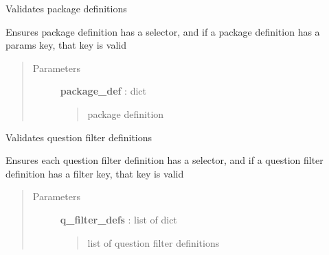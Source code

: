 \documentclass[letterpaper,10pt,english]{sphinxmanual}
\begin{document}
\begin{fulllineitems}
\label{pytan.utils:pytan.utils.val_package_def}
Validates package definitions

Ensures package definition has a selector, and if a package definition has a params key, that key is valid
\begin{quote}\begin{description}
\item[{Parameters}] \leavevmode
\textbf{package\_def} : dict
\begin{quote}

package definition
\end{quote}

\end{description}\end{quote}

\end{fulllineitems}


\begin{fulllineitems}
\label{pytan.utils:pytan.utils.val_q_filter_defs}
Validates question filter definitions

Ensures each question filter definition has a selector, and if a question filter definition has a filter key, that key is valid
\begin{quote}\begin{description}
\item[{Parameters}] \leavevmode
\textbf{q\_filter\_defs} : list of dict
\begin{quote}

list of question filter definitions
\end{quote}

\end{description}\end{quote}

\end{fulllineitems}

\end{document}
